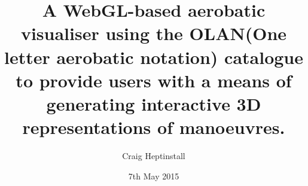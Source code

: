 
\title{A WebGL-based aerobatic visualiser using the OLAN(One letter aerobatic notation) catalogue to provide users with a means of generating interactive 3D representations of manoeuvres.}

\author{Craig Heptinstall}




\date{7th May 2015} %




\maketitle



